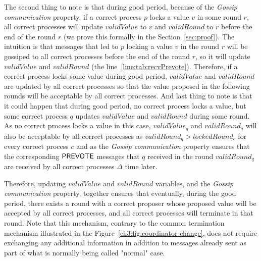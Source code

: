 The second thing to note is that during good period, because of the
\emph{Gossip communication} property, if a correct process $p$ locks a value
$v$ in some round $r$, all correct processes will update $validValue$ to $v$
and $validRound$ to $r$ before the end of the round $r$ (we prove this formally
in the Section~\ref{sec:proof}). The intuition is that messages that led to $p$
locking a value $v$ in the round $r$ will be gossiped to all correct processes
before the end of the round $r$, so it will update $validValue$ and
$validRound$ (the line~\ref{line:tab:recvPrevote}). Therefore, if a correct
process locks some value during good period, $validValue$ and $validRound$ are
updated by all correct processes so that the value proposed in the following
rounds will be acceptable by all correct processes. And last thing to note is
that it could happen that during good period, no correct process locks a value,
but some correct process $q$ updates $validValue$ and $validRound$ during some
round. As no correct process locks a value in this case, $validValue_q$ and
$validRound_q$ will also be acceptable by all correct processes as
$validRound_q > lockedRound_c$ for every correct process $c$ and as the
\emph{Gossip communication} property ensures that the corresponding $\mathsf{PREVOTE}$
messages that $q$ received in the round $validRound_q$ are received by all
correct processes $\Delta$ time later. 

Therefore, updating $validValue$ and $validRound$ variables, and the
\emph{Gossip communication} property, together ensures that eventually, during
the good period, there exists a round with a correct proposer whose proposed
value will be accepted by all correct processes, and all correct processes will
terminate in that round. Note that this mechanism, contrary to the common
termination mechanism illustrated in the
Figure~\ref{ch3:fig:coordinator-change}, does not require exchanging any
additional information in addition to messages already sent as part of what is
normally being called "normal" case.     

